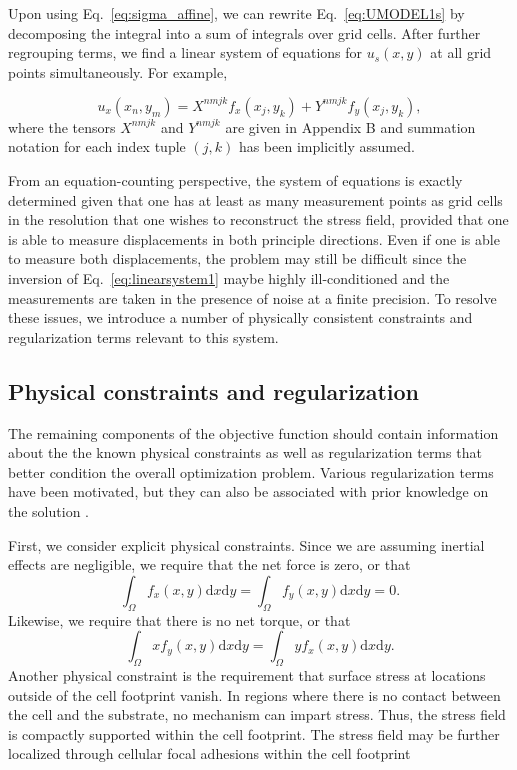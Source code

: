\documentclass[aps,prl,reprint,twocolumn,groupedaddress,showpacs]{revtex4}
\def\dd{\mbox{d}}
\begin{document}
Upon using Eq.~\ref{eq:sigma_affine}, we can rewrite
Eq.~\ref{eq:UMODEL1s} by decomposing the integral into a sum of
integrals over grid cells.  After further regrouping terms, we find a
linear system of equations for $u_{s}(x,y)$ at all grid points
simultaneously. For example, 

\begin{equation}
u_{x}(x_{n},y_{m}) = X^{nmjk}f_{x}(x_j,y_k) + Y^{nmjk}f_{y}(x_j,y_k),
\label{eq:linearsystem1}
\end{equation}
%
where the tensors $X^{nmjk}$ and $Y^{nmjk}$ are given in Appendix B and 
summation notation for each index tuple $(j,k)$ has been implicitly assumed.

From an equation-counting perspective, the system of equations is
exactly determined given that one has at least as many measurement
points as grid cells in the resolution that one wishes to reconstruct
the stress field, provided that one is able to measure displacements
in both principle directions. Even if one is able to measure both
displacements, the problem may still be difficult since the inversion
of Eq.~\ref{eq:linearsystem1} maybe highly ill-conditioned and the
measurements are taken in the presence of noise at a finite
precision. To resolve these issues, we introduce a number of
physically consistent constraints and regularization terms relevant to
this system.

\subsection{Physical constraints and regularization}

The remaining components of the objective function should contain
information about the the known physical constraints as well as
regularization terms that better condition the overall optimization
problem. Various regularization terms have been motivated, but they
can also be associated with prior knowledge on the solution
\cite{PATHINTEGRAL}. 

First, we consider explicit physical constraints. Since we are
assuming inertial effects are negligible, we require that the net
force is zero, or that
\begin{equation}
\int_\Omega f_{x}(x,y)\dd x \dd y= \int_\Omega f_{y}(x,y)\dd x \dd y = 0.
\label{NOFORCE}
\end{equation}
Likewise, we require that there is no net torque, or that
\begin{equation}
\int_\Omega x f_{y}(x,y) \dd x \dd y  = \int_\Omega y f_{x}(x,y) \dd x \dd y.
\label{NOTORQUE}
\end{equation}
%
Another physical constraint is the requirement that surface stress at
locations outside of the cell footprint vanish.  In regions where
there is no contact between the cell and the substrate, no mechanism
can impart stress.  Thus, the stress field is compactly supported
within the cell footprint.  The stress field may be further localized
through cellular focal adhesions within the cell footprint
\end{document}

